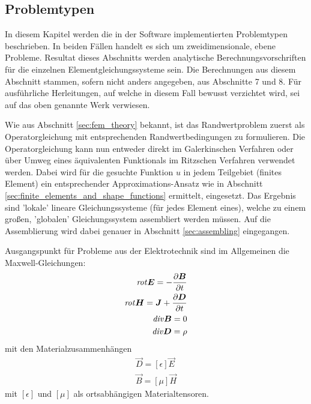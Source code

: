 \subsection{Problemtypen}
In diesem Kapitel werden die in der Software implementierten Problemtypen beschrieben. In beiden Fällen handelt es sich um zweidimensionale, ebene Probleme. Resultat dieses Abschnitts werden analytische Berechnungsvorschriften für die einzelnen Elementgleichungssysteme sein.\newline
Die Berechnungen aus diesem Abschnitt stammen, sofern nicht anders angegeben, aus \cite{SMS_VO_skript} Abschnitte 7 und 8. Für ausführliche Herleitungen, auf welche in diesem Fall bewusst verzichtet wird, sei auf das oben genannte Werk verwiesen.\newline

Wie aus Abschnitt \ref{sec:fem_theory} bekannt, ist das Randwertproblem zuerst als Operatorgleichung mit entsprechenden Randwertbedingungen zu formulieren. Die Operatorgleichung kann nun entweder direkt im Galerkinschen Verfahren oder über Umweg eines äquivalenten Funktionals im Ritzschen Verfahren verwendet werden. Dabei wird für die gesuchte Funktion $u$ in jedem Teilgebiet (finites Element) ein entsprechender Approximations-Ansatz wie in Abschnitt \ref{sec:finite_elements_and_shape_functions} ermittelt, eingesetzt. Das Ergebnis sind 'lokale' lineare Gleichungssysteme (für jedes Element eines), welche zu einem großen, 'globalen' Gleichungssystem assembliert werden müssen. Auf die Assemblierung wird dabei genauer in Abschnitt \ref{sec:assembling} eingegangen.\newline

Ausgangspunkt für Probleme aus der Elektrotechnik sind im Allgemeinen die Maxwell-Gleichungen:
\begin{align}
	\mathit{rot}\boldsymbol{E} = -\frac{\partial \boldsymbol{B}}{\partial t} \label{eq:maxwell_1} \\
	\mathit{rot}\boldsymbol{H} = \boldsymbol{J} + \frac{\partial \boldsymbol{D}}{\partial t} \label{eq:maxwell_2}\\
	\mathit{div}\boldsymbol{B} = 0 \label{eq:maxwell_3}\\
	\mathit{div}\boldsymbol{D} = \rho \label{eq:maxwell_4}
\end{align}
mit den Materialzusammenhängen
\begin{align}
\vec{D} = [\epsilon]\vec{E} \label{eq:material_1}\\
\vec{B} = [\mu]\vec{H} \label{eq:material_2}
\end{align}
mit $[\epsilon]$ und $[\mu]$ als ortsabhängigen Materialtensoren.

